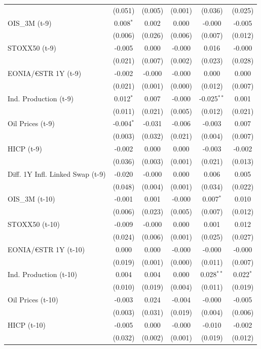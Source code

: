 \begin{longtable}[t]{lccccc}
 & (0.051) & (0.005) & (0.001) & (0.036) & (0.025)\\
OIS\_3M (t-9) & 0.008$^{*}$ & 0.002 & 0.000 & -0.000 & -0.005\\
 & (0.006) & (0.026) & (0.006) & (0.007) & (0.012)\\
STOXX50 (t-9) & -0.005 & 0.000 & -0.000 & 0.016 & -0.000\\
 & (0.021) & (0.007) & (0.002) & (0.023) & (0.028)\\
EONIA/€STR 1Y (t-9) & -0.002 & -0.000 & -0.000 & 0.000 & 0.000\\
 & (0.021) & (0.001) & (0.000) & (0.012) & (0.007)\\
Ind. Production (t-9) & 0.012$^{*}$ & 0.007 & -0.000 & -0.025$^{**}$ & 0.001\\
 & (0.011) & (0.021) & (0.005) & (0.012) & (0.021)\\
Oil Prices (t-9) & -0.004$^{*}$ & -0.031 & -0.006 & -0.003 & 0.007\\
 & (0.003) & (0.032) & (0.021) & (0.004) & (0.007)\\
HICP (t-9) & -0.002 & 0.000 & 0.000 & -0.003 & -0.002\\
 & (0.036) & (0.003) & (0.001) & (0.021) & (0.013)\\
Diff. 1Y Infl. Linked Swap (t-9) & -0.020 & -0.000 & 0.000 & 0.006 & 0.005\\
 & (0.048) & (0.004) & (0.001) & (0.034) & (0.022)\\
OIS\_3M (t-10) & -0.001 & 0.001 & -0.000 & 0.007$^{*}$ & 0.010\\
 & (0.006) & (0.023) & (0.005) & (0.007) & (0.012)\\
STOXX50 (t-10) & -0.009 & -0.000 & 0.000 & 0.001 & 0.012\\
 & (0.024) & (0.006) & (0.001) & (0.025) & (0.027)\\
EONIA/€STR 1Y (t-10) & 0.000 & 0.000 & -0.000 & -0.000 & -0.000\\
 & (0.019) & (0.001) & (0.000) & (0.011) & (0.007)\\
Ind. Production (t-10) & 0.004 & 0.004 & 0.000 & 0.028$^{**}$ & 0.022$^{*}$\\
 & (0.010) & (0.019) & (0.004) & (0.011) & (0.019)\\
Oil Prices (t-10) & -0.003 & 0.024 & -0.004 & -0.000 & -0.005\\
 & (0.003) & (0.031) & (0.019) & (0.004) & (0.006)\\
HICP (t-10) & -0.005 & 0.000 & -0.000 & -0.010 & -0.002\\
 & (0.032) & (0.002) & (0.001) & (0.019) & (0.012)\\

\end{longtable}
